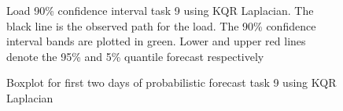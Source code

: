 \begin{figure}[!ht]
    \centering
    \caption[Prediction load track task 9, Laplacian kernel]{Load 90\% confidence interval task 9 using KQR Laplacian. The black line is the observed path for the load. The 90\% confidence interval bands are plotted in green. Lower and upper red lines denote the 95\% and 5\% quantile forecast respectively}
    \label{fig:load_task_9}
\end{figure}


\begin{figure}[!ht]
    \centering
    \caption{Boxplot for first two days of probabilistic forecast task 9 using KQR Laplacian}
    \label{fig:boxplot_load_task_9}
\end{figure}



